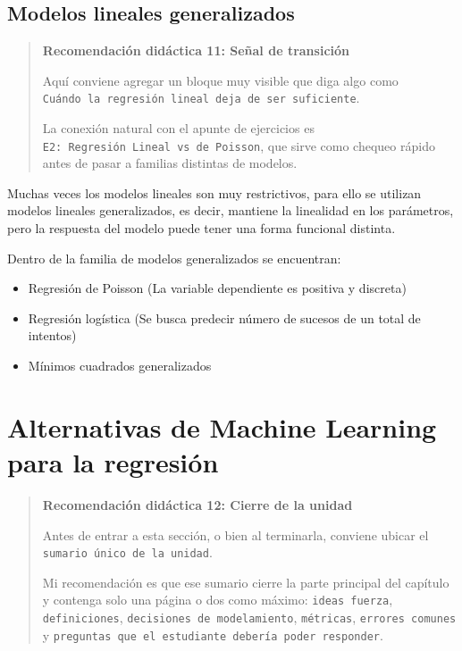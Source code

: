 \documentclass[
]{book}
\providecommand{\tightlist}{%
  \setlength{\itemsep}{0pt}\setlength{\parskip}{0pt}}
\begin{document}
\hypertarget{modelos-lineales-generalizados-1}{%
\subsection{Modelos lineales generalizados}\label{modelos-lineales-generalizados-1}}

\begin{quote}
\textbf{Recomendación didáctica 11: Señal de transición}

Aquí conviene agregar un bloque muy visible que diga algo como
\texttt{Cuándo\ la\ regresión\ lineal\ deja\ de\ ser\ suficiente}.

La conexión natural con el apunte de ejercicios es
\texttt{E2:\ Regresión\ Lineal\ vs\ de\ Poisson}, que sirve como chequeo rápido
antes de pasar a familias distintas de modelos.
\end{quote}

Muchas veces los modelos lineales son muy restrictivos, para ello se
utilizan modelos lineales generalizados, es decir, mantiene la
linealidad en los parámetros, pero la respuesta del modelo puede tener
una forma funcional distinta.

Dentro de la familia de modelos generalizados se encuentran:

\begin{itemize}
\tightlist
\item
  Regresión de Poisson (La variable dependiente es positiva y
  discreta)
\item
  Regresión logística (Se busca predecir número de sucesos de un total
  de intentos)
\item
  Mínimos cuadrados generalizados
\end{itemize}

\hypertarget{alternativas-de-machine-learning-para-la-regresiuxf3n-1}{%
\section{Alternativas de Machine Learning para la regresión}\label{alternativas-de-machine-learning-para-la-regresiuxf3n-1}}

\begin{quote}
\textbf{Recomendación didáctica 12: Cierre de la unidad}

Antes de entrar a esta sección, o bien al terminarla, conviene ubicar
el \texttt{sumario\ único\ de\ la\ unidad}.

Mi recomendación es que ese sumario cierre la parte principal del
capítulo y contenga solo una página o dos como máximo:
\texttt{ideas\ fuerza}, \texttt{definiciones}, \texttt{decisiones\ de\ modelamiento},
\texttt{métricas}, \texttt{errores\ comunes} y \texttt{preguntas\ que\ el\ estudiante\ debería\ poder\ responder}.
\end{quote}
\end{document}
